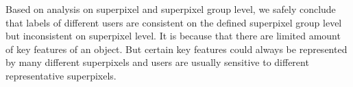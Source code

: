 \documentclass[runningheads,a4paper]{llncs}
\begin{document}
%

Based on analysis on superpixel and superpixel group level, we safely conclude that labels of different users are consistent on the defined superpixel group level but inconsistent on superpixel level. It is because that there are limited amount of key features of an object. But certain key features could always be represented by many different superpixels and users are usually sensitive to different representative superpixels.
\end{document}
